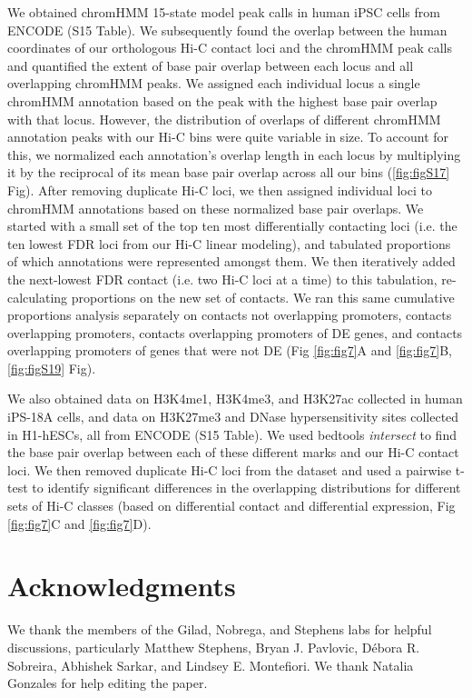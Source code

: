 We obtained chromHMM 15-state model peak calls in human iPSC cells from ENCODE \cite{consortium.2012a} (S15 Table). We subsequently found the overlap between the human coordinates of our orthologous Hi-C contact loci and the chromHMM peak calls and quantified the extent of base pair overlap between each locus and all overlapping chromHMM peaks. We assigned each individual locus a single chromHMM annotation based on the peak with the highest base pair overlap with that locus. However, the distribution of overlaps of different chromHMM annotation peaks with our Hi-C bins were quite variable in size. To account for this, we normalized each annotation's overlap length in each locus by multiplying it by the reciprocal of its mean base pair overlap across all our bins (\ref{fig:figS17} Fig). After removing duplicate Hi-C loci, we then assigned individual loci to chromHMM annotations based on these normalized base pair overlaps. We started with a small set of the top ten most differentially contacting loci (i.e. the ten lowest FDR loci from our Hi-C linear modeling), and tabulated proportions of which annotations were represented amongst them. We then iteratively added the next-lowest FDR contact (i.e. two Hi-C loci at a time) to this tabulation, re-calculating proportions on the new set of contacts. We ran this same cumulative proportions analysis separately on contacts not overlapping promoters, contacts overlapping promoters, contacts overlapping promoters of DE genes, and contacts overlapping promoters of genes that were not DE (Fig \ref{fig:fig7}A and \ref{fig:fig7}B, \ref{fig:figS19} Fig).

We also obtained data on H3K4me1, H3K4me3, and H3K27ac collected in human iPS-18A cells, and data on H3K27me3 and DNase hypersensitivity sites collected in H1-hESCs, all from ENCODE \cite{consortium.2012a} (S15 Table). We used bedtools \textit{intersect} \cite{Quinlan.2010} to find the base pair overlap between each of these different marks and our Hi-C contact loci. We then removed duplicate Hi-C loci from the dataset and used a pairwise t-test to identify significant differences in the overlapping distributions for different sets of Hi-C classes (based on differential contact and differential expression, Fig \ref{fig:fig7}C and \ref{fig:fig7}D).

\section{Acknowledgments}

We thank the members of the Gilad, Nobrega, and Stephens labs for helpful discussions, particularly Matthew Stephens, Bryan J. Pavlovic, D\'ebora R. Sobreira, Abhishek Sarkar, and Lindsey E. Montefiori. We thank Natalia Gonzales for help editing the paper.

